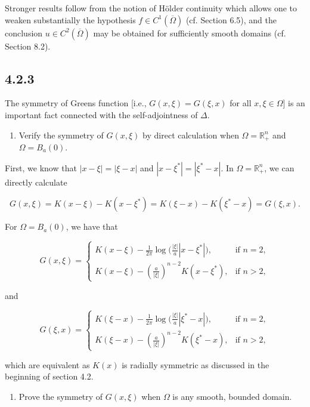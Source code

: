 \documentclass{article}
\begin{document}
Stronger results follow from the notion of H\"{o}lder continuity which allows one to weaken substantially the hypothesis $f\in C^1(\overline{\Omega})$ (cf. Section 6.5), and the conclusion $u\in C^2(\overline{\Omega})$ may be obtained for sufficiently smooth domains (cf. Section 8.2).

\subsection{\textbf{4.2.3}} The symmetry of Green\textsc{}s function [i.e., $G(x,\xi)=G(\xi,x)$ for all $x,\xi\in \Omega$] is an important fact connected with the self-adjointness of $\Delta$.

\begin{enumerate}[label=(\alph*)]
    \item Verify the symmetry of $G(x,\xi)$ by direct calculation when $\Omega = \mathbb R_+^n$ and $\Omega = B_a(0)$.
\end{enumerate}

\newcommand{\mystar}{{\fontfamily{lmr}\selectfont$\star$}}

First, we know that $|x-\xi|=|\xi-x|$ and $|x-\xi^{*}|=|\xi^{*}-x|$. In $\Omega = \mathbb R_+^n$, we can directly calculate

\newcommand{\mystar}{{\fontfamily{lmr}\selectfont$\star$}}

$$G(x,\xi)=K(x - \xi)-K(x-\xi^{*})= K(\xi - x)-K(\xi^{*}-x)=G(\xi,x).$$

For $\Omega = B_a(0)$, we have that

\[
  G(x,\xi) =
  \begin{cases}
  K(x-\xi) - \frac{1}{2\pi}\log\big(\frac{|\xi|}{a}|x-\xi^{*}|\big), & \text{if $n=2$}, \\
  K(x-\xi) - (\frac{a}{|\xi|})^{n-2}K(x-\xi^{*}), & \text{if $n>2$},
  \end{cases}
\]

and

\[
  G(\xi,x) =
  \begin{cases}
  K(\xi-x) - \frac{1}{2\pi}\log\big(\frac{|\xi|}{a}|\xi^{*}-x|\big), & \text{if $n=2$}, \\
  K(\xi-x) - (\frac{a}{|\xi|})^{n-2}K(\xi^{*}-x), & \text{if $n>2$},
  \end{cases}
\]

which are equivalent as $K(x)$ is radially symmetric as discussed in the beginning of section 4.2.


\begin{enumerate}[label=(\alph*),start=2]
    \item Prove the symmetry of $G(x,\xi)$ when $\Omega$ is any smooth, bounded domain.
\end{enumerate}
\end{document}
